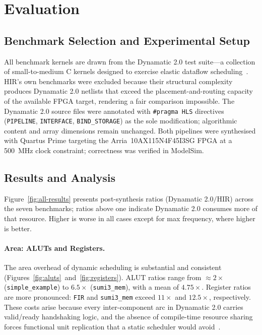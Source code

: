 \documentclass[sigplan,10pt,review,nonacm]{acmart}
\begin{document}
\section{Evaluation}

\subsection{Benchmark Selection and Experimental Setup}

All benchmark kernels are drawn from the Dynamatic 2.0 test suite---a
collection of small-to-medium C kernels designed to exercise elastic
dataflow scheduling~\cite{10.1145/3373087.3375391}. HIR's own
benchmarks were excluded because their structural complexity produces
Dynamatic 2.0 netlists that exceed the placement-and-routing capacity of
the available FPGA target, rendering a fair comparison impossible.
The Dynamatic 2.0 source files were annotated with \texttt{\#pragma HLS}
directives (\texttt{PIPELINE}, \texttt{INTERFACE}, \texttt{BIND\_STORAGE})
as the sole modification; algorithmic content and array dimensions
remain unchanged. Both pipelines were synthesised with Quartus Prime
targeting the Arria~10AX115N4F45I3SG FPGA at a 500~MHz clock
constraint; correctness was verified in ModelSim.

\subsection{Results and Analysis}
\label{sec:results}

Figure~\ref{fig:all-results} presents post-synthesis ratios
(Dynamatic 2.0$/$HIR) across the seven benchmarks; ratios above one
indicate Dynamatic 2.0 consumes more of that resource. Higher is worse
in all cases except for max frequency, where higher is better.

\paragraph{Area: ALUTs and Registers.}
The area overhead of dynamic scheduling is substantial and consistent
(Figures~\ref{fig:aluts}~and~\ref{fig:registers}). ALUT ratios range
from ${\approx}2\times$ (\texttt{simple\_example}) to $6.5\times$
(\texttt{sumi3\_mem}), with a mean of $4.75\times$. Register ratios are
more pronounced: \texttt{FIR} and \texttt{sumi3\_mem} exceed $11\times$
and $12.5\times$, respectively. These costs arise because every
inter-component arc in Dynamatic 2.0 carries valid/ready handshaking logic,
and the absence of compile-time resource sharing forces functional unit
replication that a static scheduler would avoid~\cite{9378784}.
\end{document}
